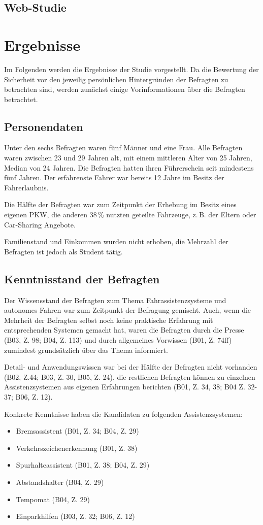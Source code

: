 \documentclass[12pt]{article}
\begin{document}
\subsection{Web-Studie}

\clearpage
\section{Ergebnisse}
Im Folgenden werden die Ergebnisse der Studie vorgestellt. Da die Bewertung der Sicherheit vor den jeweilig persönlichen Hintergründen der Befragten zu betrachten sind, werden zunächst einige Vorinformationen über die Befragten betrachtet.
\subsection*{Personendaten}
Unter den sechs Befragten waren fünf Männer und eine Frau. Alle Befragten waren zwischen 23 und 29 Jahren alt, mit einem mittleren Alter von 25 Jahren, Median von 24 Jahren. Die Befragten hatten ihren Führerschein seit mindestens fünf Jahren. Der erfahrenste Fahrer war bereits 12 Jahre im Besitz der Fahrerlaubnis.

Die Hälfte der Befragten war zum Zeitpunkt der Erhebung im Besitz eines eigenen PKW, die anderen 38\,\% nutzten geteilte Fahrzeuge, z.\,B. der Eltern oder Car-Sharing Angebote.

Familienstand und Einkommen wurden nicht erhoben, die Mehrzahl der Befragten ist jedoch als Student tätig.

\subsection{Kenntnisstand der Befragten}
Der Wissensstand der Befragten zum Thema Fahrassistenzsysteme und autonomes Fahren war zum Zeitpunkt der Befragung gemischt. Auch, wenn die Mehrheit der Befragten selbst noch keine praktische Erfahrung mit entsprechenden Systemen gemacht hat, waren die Befragten durch die Presse (B03, Z. 98; B04, Z. 113) und durch allgemeines Vorwissen (B01, Z. 74ff) zumindest grundsätzlich über das Thema informiert.

Detail- und Anwendungswissen war bei der Hälfte der Befragten nicht vorhanden (B02, Z.44; B03, Z. 30, B05, Z. 24), die restlichen Befragten können  zu einzelnen Assistenzsystemen aus eigenen Erfahrungen berichten (B01, Z. 34, 38; B04 Z. 32-37; B06, Z. 12).

Konkrete Kenntnisse haben die Kandidaten zu folgenden Assistenzsystemen:
\begin{itemize}
    \item Bremsassistent (B01, Z. 34; B04, Z. 29)
    \item Verkehrszeichenerkennung (B01, Z. 38)
    \item Spurhalteassistent (B01, Z. 38; B04, Z. 29)
    \item Abstandshalter (B04, Z. 29)
    \item Tempomat (B04, Z. 29)
    \item Einparkhilfen (B03, Z. 32; B06, Z. 12)
\end{itemize}
\end{document}
